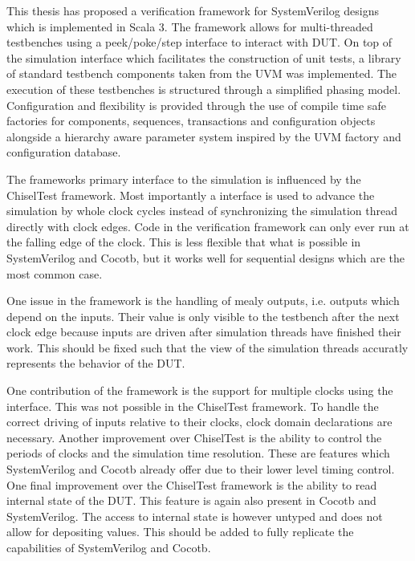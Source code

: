 This thesis has proposed a verification framework for SystemVerilog designs which is implemented in Scala 3. The framework allows for multi-threaded testbenches using a peek/poke/step interface to interact with DUT. On top of the simulation interface which facilitates the construction of unit tests, a library of standard testbench components taken from the UVM was implemented. The execution of these testbenches is structured through a simplified phasing model. Configuration and flexibility is provided through the use of compile time safe factories for components, sequences, transactions and configuration objects alongside a hierarchy aware parameter system inspired by the UVM factory and configuration database.


The frameworks primary interface to the simulation is influenced by the ChiselTest framework. Most importantly a  interface is used to advance the simulation by whole clock cycles instead of synchronizing the simulation thread directly with clock edges. Code in the verification framework can only ever run at the falling edge of the clock. This is less flexible that what is possible in SystemVerilog and Cocotb, but it works well for sequential designs which are the most common case. 

One issue in the framework is the handling of mealy outputs, i.e. outputs which depend on the inputs. Their value is only visible to the testbench after the next clock edge because inputs are driven after simulation threads have finished their work. This should be fixed such that the view of the simulation threads accuratly represents the behavior of the DUT.

One contribution of the framework is the support for multiple clocks using the  interface. This was not possible in the ChiselTest framework. To handle the correct driving of inputs relative to their clocks, clock domain declarations are necessary. Another improvement over ChiselTest is the ability to control the periods of clocks and the simulation time resolution. These are features which SystemVerilog and Cocotb already offer due to their lower level timing control. One final improvement over the ChiselTest framework is the ability to read internal state of the DUT. This feature is again also present in Cocotb and SystemVerilog. The access to internal state is however untyped and does not allow for depositing values. This should be added to fully replicate the capabilities of SystemVerilog and Cocotb.

